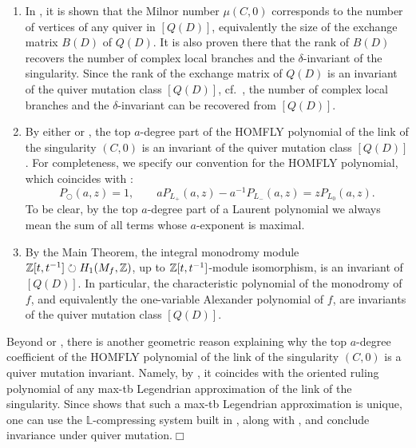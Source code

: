 \begin{enumerate}[label=$(\roman*)$]
    \item In \cite[Proposition 4.7]{FPST}, it is shown that the Milnor number $\mu(C,0)$ corresponds to the number of vertices of any quiver in $[Q(D)]$, equivalently the size of the exchange matrix $B(D)$ of $Q(D)$. It is also proven there that the rank of $B(D)$ recovers the number of complex local branches and the $\delta$-invariant of the singularity. Since the rank of the exchange matrix of $Q(D)$ is an invariant of the quiver mutation class $[Q(D)]$, cf.~\cite[Theorem 2.8.3]{fomin2024introductionclusteralgebraschapters}, the number of complex local branches and the $\delta$-invariant can be recovered from $[Q(D)]$.\\

    \item By either \cite[Proposition 2.10]{GL} or \cite[Theorem 4.22]{casals_positroid}, the top $a$-degree part of the HOMFLY polynomial of the link of the singularity $(C,0)$ is an invariant of the quiver mutation class $[Q(D)]$. %
    For completeness, we specify our convention for the HOMFLY polynomial, which coincides with \cite[Eq.~(2.3)]{GL}:
\[
 P_{\bigcirc}(a,z)=1,
 \qquad
 aP_{L_+}(a,z)-a^{-1}P_{L_-}(a,z)=zP_{L_0}(a,z).
\]
To be clear, by the top
$a$-degree part of a Laurent polynomial we always mean the sum of all terms whose $a$-exponent is maximal.\\

    \item By the Main Theorem, the integral monodromy module $\mathbb Z[t,t^{-1}]\circlearrowright H_1(M_f,\mathbb Z)$, up to $\mathbb Z[t,t^{-1}]$-module isomorphism, is an invariant of $[Q(D)]$. In particular, the characteristic polynomial of the monodromy of $f$, and equivalently the one-variable Alexander polynomial of $f$, are invariants of the quiver mutation class $[Q(D)]$.
\end{enumerate}

\begin{remark} Beyond \cite[Proposition 2.10]{GL} or \cite[Theorem 4.22]{casals_positroid}, there is another geometric reason explaining why the top $a$-degree coefficient of the HOMFLY polynomial of the link of the singularity $(C,0)$ is a quiver mutation invariant. Namely, by \cite[Section 4]{Rutherford_HOMFLY}, it coincides with the oriented ruling polynomial of any max-tb Legendrian approximation of the link of the singularity. Since \cite[Proposition 2.2]{Casals_LagrangianPlaneCurve} shows that such a max-tb Legendrian approximation is unique, one can use the $\mathbb{L}$-compressing system built in  \cite[Theorem 1.1]{Casals_LagrangianPlaneCurve}, along with \cite{CasalsGao}, and conclude invariance under quiver mutation.\hfill$\Box$
\end{remark}

